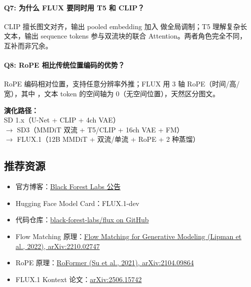 \paragraph{Q7: 为什么 FLUX 要同时用 T5 和 CLIP？}
CLIP 擅长图文对齐，输出 pooled embedding 加入  做全局调制；T5 理解复杂长文本，输出 sequence tokens 参与双流块的联合 Attention。两者角色完全不同，互补而非冗余。

\paragraph{Q8: RoPE 相比传统位置编码的优势？}
RoPE 编码相对位置，支持任意分辨率外推；FLUX 用 3 轴 RoPE（时间/高/宽），其中 ，文本 token 的空间轴为 0（无空间位置），天然区分图文。

\begin{summarybox}
\textbf{演化路径：}\\
SD 1.x（U-Net + CLIP + 4ch VAE）\\
$\to$ SD3（MMDiT 双流 + T5/CLIP + 16ch VAE + FM）\\
$\to$ FLUX.1（12B MMDiT + 双流/单流 + RoPE + 2 种蒸馏）
\end{summarybox}

\subsection{推荐资源}

\begin{itemize}[leftmargin=1.5em]
  \item 官方博客：\href{https://bfl.ai/announcing-black-forest-labs/}{Black Forest Labs 公告}
  \item Hugging Face Model Card：FLUX.1-dev
  \item 代码仓库：\href{https://github.com/black-forest-labs/flux}{black-forest-labs/flux on GitHub}
  \item Flow Matching 原理：\href{https://arxiv.org/abs/2210.02747}{Flow Matching for Generative Modeling (Lipman et al., 2022), arXiv:2210.02747}
  \item RoPE 原理：\href{https://arxiv.org/abs/2104.09864}{RoFormer (Su et al., 2021), arXiv:2104.09864}
  \item FLUX.1 Kontext 论文：\href{https://arxiv.org/abs/2506.15742}{arXiv:2506.15742}
\end{itemize}

